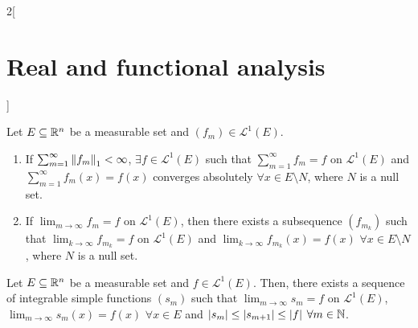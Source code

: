 \documentclass[../../../main_math.tex]{subfiles}
\begin{document}
\begin{multicols}{2}[\section{Real and functional analysis}]
\begin{definition}
  \end{definition}
  \begin{theorem}
    Let $E\subseteq\mathbb{R}^n$ be a measurable set and $(f_m)\in \mathcal{L}^1(E)$.
    \begin{enumerate}
      \item If $\sum_{m=1}^\infty {\left\|f_m\right\|}_1<\infty$, $\exists f\in \mathcal{L}^1(E)$ such that $\sum_{m=1}^\infty f_m =f$ on $ \mathcal{L}^1(E)$ and $\sum_{m=1}^\infty f_m(x)=f(x)$ converges absolutely $\forall x\in E\setminus N$, where $N$ is a null set.
      \item If $\displaystyle\lim_{m\to\infty} f_m=f$ on $ \mathcal{L}^1(E)$, then there exists a subsequence $(f_{m_k})$ such that $\displaystyle\lim_{k\to\infty} f_{m_k}=f$ on $ \mathcal{L}^1(E)$ and  $\displaystyle\lim_{k\to\infty} f_{m_k}(x)=f(x)$ $\forall x\in E\setminus N$, where $N$ is a null set.
    \end{enumerate}
  \end{theorem}
  \begin{proposition}
    Let $E\subseteq\mathbb{R}^n$ be a measurable set and $f\in \mathcal{L}^1(E)$. Then, there exists a sequence of integrable simple functions $(s_m)$ such that $\displaystyle\lim_{m\to\infty} s_m=f$ on $ \mathcal{L}^1(E)$, $\displaystyle\lim_{m\to\infty} s_m(x)=f(x)$ $\forall x\in E$ and $\abs{s_m}\leq\abs{s_{m+1}}\leq \abs{f}$ $\forall m\in\mathbb{N}$.
  \end{proposition}

\end{multicols}
\end{document}
